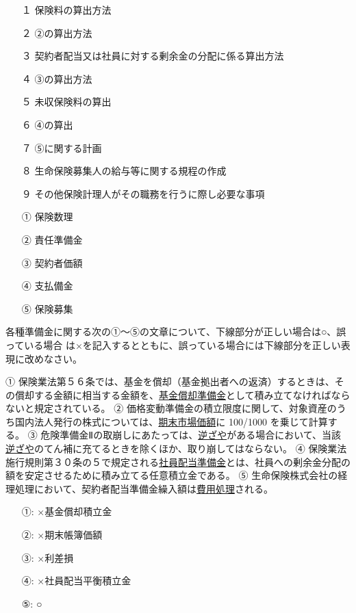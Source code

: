 \documentclass[report,gutter=10mm,fore-edge=10mm,uplatex,dvipdfmx]{jlreq}
\begin{document}
\begin{itemize}
\item[ １]  保険料の算出方法
\item[ ２]  ②の算出方法
\item[ ３]  契約者配当又は社員に対する剰余金の分配に係る算出方法
\item[ ４]  ③の算出方法
\item[ ５]  未収保険料の算出
\item[ ６]  ④の算出
\item[ ７]  ⑤に関する計画
\item[ ８]  生命保険募集人の給与等に関する規程の作成
\item[ ９]  その他保険計理人がその職務を行うに際し必要な事項
\end{itemize}
\answer{}
\begin{itemize}
\item[ ① ] 保険数理
\item[ ② ] 責任準備金
\item[ ③ ] 契約者価額
\item[ ④ ] 支払備金
\item[ ⑤ ] 保険募集
\end{itemize}


各種準備金に関する次の①～⑤の文章について、下線部分が正しい場合は○、誤っている場合
は×を記入するとともに、誤っている場合には下線部分を正しい表現に改めなさい。

① 保険業法第５６条では、基金を償却（基金拠出者への返済）するときは、その償却する金額に相当する金額を、\underline{基金償却準備金}として積み立てなければならないと規定されている。
② 価格変動準備金の積立限度に関して、対象資産のうち国内法人発行の株式については、\underline{期末市場価額}に 100/1000 を乗じて計算する。
③ 危険準備金Ⅱの取崩しにあたっては、\underline{逆ざや}がある場合において、当該\underline{逆ざや}のてん補に充てるときを除くほか、取り崩してはならない。
④ 保険業法施行規則第３０条の５で規定される\underline{社員配当準備金}とは、社員への剰余金分配の額を安定させるために積み立てる任意積立金である。
⑤ 生命保険株式会社の経理処理において、契約者配当準備金繰入額は\underline{費用処理}される。

\answer{}
\begin{itemize}
\item[ ①: ] ×基金償却積立金
\item[ ②: ] ×期末帳簿価額
\item[ ③: ] ×利差損
\item[ ④: ] ×社員配当平衡積立金
\item[ ⑤: ] ○
\end{itemize}
\end{document}
